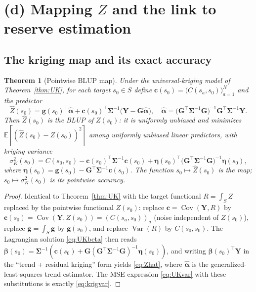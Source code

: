 \documentclass{amsart}
\newtheorem{theorem}{Theorem}
\theoremstyle{definition}
\newcommand{\E}{\mathbb{E}}
\newcommand{\Var}{\operatorname{Var}}
\newcommand{\Cov}{\operatorname{Cov}}
\newcommand{\Zhat}{\widehat Z}
\begin{document}
\section{(d) Mapping $Z$ and the link to reserve estimation}
\label{sec:map}

\subsection{The kriging map and its exact accuracy}

\begin{theorem}[Pointwise BLUP map]\label{thm:map}
Under the universal-kriging model of Theorem~\ref{thm:UK}, for each target
$s_0\in S$ define
$\mathbf c(s_0)=\big(C(s_a,s_0)\big)_{a=1}^N$ and the predictor
\begin{equation}\label{eq:Zhat}
\Zhat(s_0)=\mathbf g(s_0)^\top\widehat{\boldsymbol\alpha}
+\mathbf c(s_0)^\top\boldsymbol\Sigma^{-1}
\big(\mathbf Y-\mathbf G\widehat{\boldsymbol\alpha}\big),
\quad
\widehat{\boldsymbol\alpha}
=\big(\mathbf G^\top\boldsymbol\Sigma^{-1}\mathbf G\big)^{-1}
\mathbf G^\top\boldsymbol\Sigma^{-1}\mathbf Y .
\end{equation}
Then $\Zhat(s_0)$ is the BLUP of $Z(s_0)$: it is uniformly unbiased and
minimizes $\E[(\Zhat(s_0)-Z(s_0))^2]$ among uniformly unbiased linear
predictors, with \emph{kriging variance}
\begin{equation}\label{eq:krigvar}
\sigma_K^2(s_0)=C(s_0,s_0)-\mathbf c(s_0)^\top\boldsymbol\Sigma^{-1}
\mathbf c(s_0)
+\boldsymbol\eta(s_0)^\top\big(\mathbf G^\top\boldsymbol\Sigma^{-1}
\mathbf G\big)^{-1}\boldsymbol\eta(s_0),
\end{equation}
where $\boldsymbol\eta(s_0)=\mathbf g(s_0)
-\mathbf G^\top\boldsymbol\Sigma^{-1}\mathbf c(s_0)$. The function
$s_0\mapsto\Zhat(s_0)$ is the \emph{map}; $s_0\mapsto\sigma_K^2(s_0)$ is
its pointwise accuracy.
\end{theorem}
\begin{proof}
Identical to Theorem~\ref{thm:UK} with the target functional $R=\int_S Z$
replaced by the pointwise functional $Z(s_0)$: replace
$\mathbf c=\Cov(\mathbf Y,R)$ by $\mathbf c(s_0)=\Cov(\mathbf
Y,Z(s_0))=(C(s_a,s_0))_a$ (noise independent of $Z(s_0)$), replace
$\bar{\mathbf g}=\int_S\mathbf g$ by $\mathbf g(s_0)$, and replace
$\Var(R)$ by $C(s_0,s_0)$. The Lagrangian solution \eqref{eq:UKbeta} then
reads $\boldsymbol\beta(s_0)=\boldsymbol\Sigma^{-1}(\mathbf c(s_0)+\mathbf
G(\mathbf G^\top\boldsymbol\Sigma^{-1}\mathbf G)^{-1}\boldsymbol\eta(s_0))$,
and writing $\boldsymbol\beta(s_0)^\top\mathbf Y$ in the
``trend + residual kriging'' form yields \eqref{eq:Zhat}, where
$\widehat{\boldsymbol\alpha}$ is the generalized-least-squares trend
estimator. The MSE expression \eqref{eq:UKvar} with these substitutions is
exactly \eqref{eq:krigvar}.
\end{proof}
\end{document}

